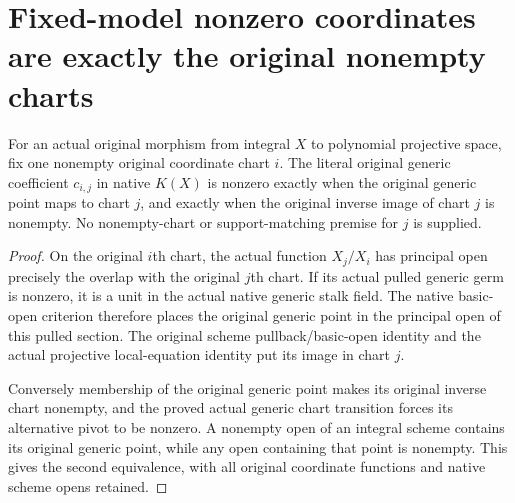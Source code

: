 \section{Fixed-model nonzero coordinates are exactly the original nonempty charts}
\label{sec:projective-native-coordinate-chart-support}

\begin{theorem}
\label{thm:projective-native-coordinate-chart-support}
\leanok
{}
For an actual original morphism from integral $X$ to polynomial
projective space, fix one nonempty original coordinate chart $i$.
The literal original generic coefficient $c_{i,j}$ in native $K(X)$
is nonzero exactly when the original generic point maps to chart $j$,
and exactly when the original inverse image of chart $j$ is nonempty.
No nonempty-chart or support-matching premise for $j$ is supplied.
\end{theorem}
\begin{proof}
On the original $i$th chart, the actual function $X_j/X_i$ has principal
open precisely the overlap with the original $j$th chart. If its actual
pulled generic germ is nonzero, it is a unit in the actual native generic
stalk field. The native basic-open criterion therefore places the
original generic point in the principal open of this pulled section.
The original scheme pullback/basic-open identity and the actual
projective local-equation identity put its image in chart $j$.

Conversely membership of the original generic point makes its original
inverse chart nonempty, and the proved actual generic chart transition
forces its alternative pivot to be nonzero. A nonempty open of an
integral scheme contains its original generic point, while any open
containing that point is nonempty. This gives the second equivalence,
with all original coordinate functions and native scheme opens retained.
\end{proof}
